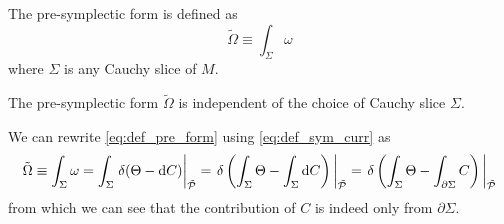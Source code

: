 \documentclass[10pt]{article}
\begin{document}
\begin{definition}
    The pre-symplectic form is defined as
    \begin{equation}
        \tilde{\Omega}\equiv\int_\Sigma \omega\label{eq:def_pre_form}
    \end{equation}
    where $\Sigma$ is any Cauchy slice of $M$.
\end{definition}
\begin{claim}
    The pre-symplectic form $\tilde{\Omega}$ is independent of the choice of Cauchy slice $\Sigma$.
\end{claim}
We can rewrite \cref{eq:def_pre_form} using \cref{eq:def_sym_curr} as 
\begin{equation}
    \tilde{\Omega}\equiv\int_\Sigma \omega=\int_\Sigma \eval{\delta(\Theta-\dd{C})}_{\tilde{\mathcal{P}}}=\eval{\delta\left(\int_\Sigma\Theta-\int_\Sigma\dd{C}\right)}_{\tilde{\mathcal{P}}}=\eval{\delta\left(\int_\Sigma\Theta-\int_{\partial\Sigma}C\right)}_{\tilde{\mathcal{P}}}
\end{equation}
from which we can see that the contribution of $C$ is indeed only from $\partial\Sigma$.
\end{document}
